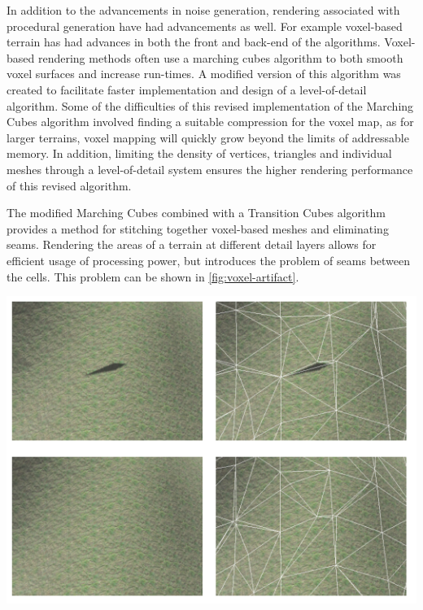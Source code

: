 \documentclass[10pt]{report}
\begin{document}
		In addition to the advancements in noise generation, rendering associated with procedural generation have had advancements as well. For example voxel-based terrain has had advances in both the front and back-end of the algorithms. Voxel-based rendering methods often use a marching cubes algorithm to both smooth voxel surfaces and increase run-times. A modified version of this algorithm was created to facilitate faster implementation and design of a level-of-detail algorithm. Some of the difficulties of this revised implementation of the Marching Cubes algorithm involved finding a suitable compression for the voxel map, as for larger terrains, voxel mapping will quickly grow beyond the limits of addressable memory. In addition, limiting the density of vertices, triangles and individual meshes through a level-of-detail system ensures the higher rendering performance of this revised algorithm. 
		
		The modified Marching Cubes combined with a Transition Cubes algorithm provides a method for stitching together voxel-based meshes and eliminating seams. Rendering the areas of a terrain at different detail layers allows for efficient usage of processing power, but introduces the problem of seams between the cells. This problem can be shown in \autoref{fig:voxel-artifact}. 
		
		\begin{minipage}{\textwidth}
			\centering
			\includegraphics[scale=.75]{voxel-seam}
			\label{fig:voxel-artifact}
		\end{minipage}
		
\end{document}
